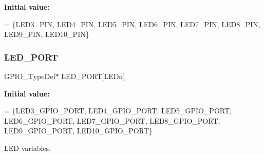 {\bfseries Initial value\+:}
\begin{DoxyCode}
= \{LED3\_PIN, LED4\_PIN, LED5\_PIN, LED6\_PIN,
                                 LED7\_PIN, LED8\_PIN, LED9\_PIN, LED10\_PIN\}
\end{DoxyCode}
\mbox{\label{group__STM32F3__DISCOVERY__Private__Variables_ga1127c0cf12e4ec7a66f2a64cd7407218}} 
\subsubsection{\texorpdfstring{L\+E\+D\+\_\+\+P\+O\+RT}{LED\_PORT}}
{\footnotesize\ttfamily G\+P\+I\+O\+\_\+\+Type\+Def$\ast$ L\+E\+D\+\_\+\+P\+O\+RT\mbox{[}L\+E\+Dn\mbox{]}}

{\bfseries Initial value\+:}
\begin{DoxyCode}
= \{LED3\_GPIO\_PORT, LED4\_GPIO\_PORT, LED5\_GPIO\_PORT, LED6\_GPIO\_PORT,
                                 LED7\_GPIO\_PORT, LED8\_GPIO\_PORT, LED9\_GPIO\_PORT, LED10\_GPIO\_PORT\}
\end{DoxyCode}


L\+ED variables. 


